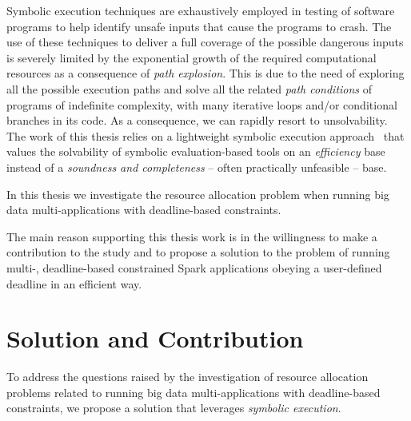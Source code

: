 Symbolic execution techniques are exhaustively employed in testing of software programs to help identify unsafe inputs that cause the programs to crash. The use of these techniques to deliver a full coverage of the possible dangerous inputs is severely limited by the exponential growth of the required computational resources as a consequence of \textit{path explosion}. This is  due to the need of exploring all the possible execution paths and solve all the related  \textit{path conditions} of programs of indefinite complexity, with many iterative loops and/or conditional branches in its code. As a consequence, we can rapidly resort to unsolvability. The work of this thesis relies on a lightweight symbolic execution  approach~\cite{Baresi-Quattrocchi-Denaro:2019} that values the solvability of symbolic evaluation-based tools on an \textit{efficiency} base instead of a \textit{soundness and completeness} -- often practically unfeasible -- base.

In this thesis we investigate the resource allocation problem when running big data multi-\plan applications with deadline-based \qos constraints. 


The main reason supporting this thesis work is in the willingness to make a contribution to the study and to propose a solution to the problem of running multi-\plan, deadline-based \qos constrained Spark applications obeying a user-defined deadline in an efficient way.

\section{Solution and Contribution}\label{sec:solution_contribution}
To address the questions raised by the investigation of resource allocation problems related to running big data multi-\plan applications with deadline-based \qos constraints, we propose a solution that leverages \textit{symbolic execution}. 

